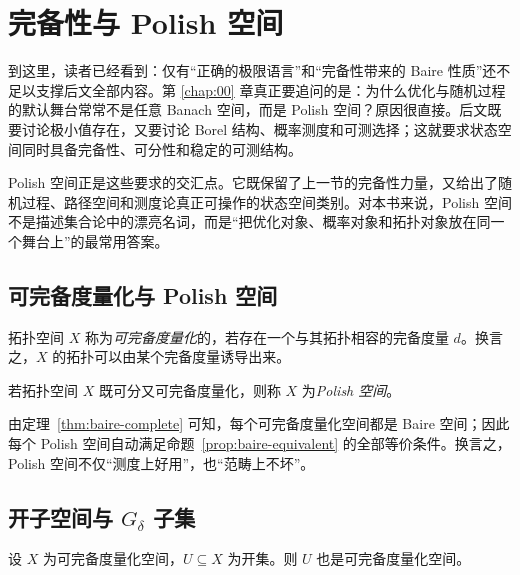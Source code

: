 \section{完备性与 Polish 空间}

\label{sec:1-3}

到这里，读者已经看到：仅有“正确的极限语言”和“完备性带来的 Baire 性质”还不足以支撑后文全部内容。第 \ref{chap:00} 章真正要追问的是：为什么优化与随机过程的默认舞台常常不是任意 Banach 空间，而是 Polish 空间？原因很直接。后文既要讨论极小值存在，又要讨论 Borel 结构、概率测度和可测选择；这就要求状态空间同时具备完备性、可分性和稳定的可测结构。

Polish 空间正是这些要求的交汇点。它既保留了上一节的完备性力量，又给出了随机过程、路径空间和测度论真正可操作的状态空间类别。对本书来说，Polish 空间不是描述集合论中的漂亮名词，而是“把优化对象、概率对象和拓扑对象放在同一个舞台上”的最常用答案。

\subsection{可完备度量化与 Polish 空间}

\begin{definition}[可完备度量化]\label{def:completely-metrizable}
拓扑空间 $X$ 称为\emph{可完备度量化}的，若存在一个与其拓扑相容的完备度量 $d$。换言之，$X$ 的拓扑可以由某个完备度量诱导出来。
\end{definition}

\begin{definition}[Polish 空间]\label{def:polish-space}
若拓扑空间 $X$ 既可分又可完备度量化，则称 $X$ 为\emph{Polish 空间}。
\end{definition}

由定理~\ref{thm:baire-complete} 可知，每个可完备度量化空间都是 Baire 空间；因此每个 Polish 空间自动满足命题~\ref{prop:baire-equivalent} 的全部等价条件。换言之，Polish 空间不仅“测度上好用”，也“范畴上不坏”。

\subsection{开子空间与 $G_\delta$ 子集}

\begin{theorem}[开子空间的可完备度量化]\label{thm:open-subspace-completely-metrizable}
设 $X$ 为可完备度量化空间，$U\subseteq X$ 为开集。则 $U$ 也是可完备度量化空间。
\end{theorem}

